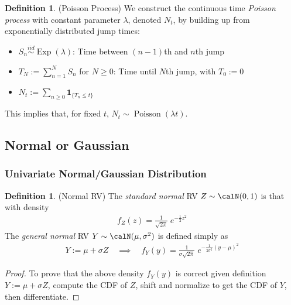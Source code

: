 \documentclass[12pt]{article}
\theoremstyle{plain}
\theoremstyle{definition}
\newtheorem{defn}[thm]{Definition}
\theoremstyle{remark}
\newcommand{\one}[1]{\mathbf{1}_{#1}}
\newcommand{\iid}{\overset{iid}{\sim}}
\newcommand{\sumnN}{\sum^N_{n=1}}
\begin{document}
\begin{defn}(Poisson Process)
We construct the continuous time \emph{Poisson process} with constant
parameter $\lambda$, denoted $N_t$, by building up from exponentially
distributed jump times:
\begin{itemize}
  \item $S_n\iid \operatorname{Exp}(\lambda)$:
    Time between $(n-1)$th and $n$th jump
  \item $T_N:=\sumnN S_n$ for $N\geq 0$:
    Time until $N$th jump, with $T_0:=0$
  \item $N_t:=\sum_{n\geq 0} \one{\{T_n\leq t\}}$
\end{itemize}
This implies that, for fixed $t$,
$N_t\sim\operatorname{Poisson}(\lambda t)$.
\end{defn}


\clearpage
\subsection{Normal or Gaussian}

\subsubsection{Univariate Normal/Gaussian Distribution}

\begin{defn}(Normal RV)
  \label{defn:stdnormal}
The \emph{standard normal} RV $Z\sim \calN(0,1)$ is that with density
\begin{align*}
   f_Z(z)
   = \frac{1}{\sqrt{2\pi}} \; e^{-\frac{1}{2}z^2}
\end{align*}
The \emph{general normal} RV $Y\sim\calN(\mu,\sigma^2)$ is defined
simply as
\begin{align*}
  Y := \mu + \sigma Z
  \quad\implies\quad
   f_Y(y) =
   \frac{1}{\sigma \sqrt{2\pi}}
   \; e^{-\frac{1}{2\sigma^2} (y - \mu)^2}
\end{align*}
\end{defn}
\begin{proof}
To prove that the above density $f_Y(y)$ is correct given definition
$Y:=\mu+\sigma Z$, compute the CDF of $Z$, shift and normalize to get
the CDF of $Y$, then differentiate.
\end{proof}
\end{document}

